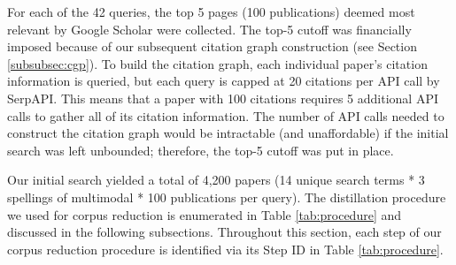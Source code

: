 \documentclass[manuscript,screen,review]{acmart}
\begin{document}
For each of the 42 queries, the top 5 pages (100 publications) deemed most relevant by Google Scholar were collected. The top-5 cutoff was financially imposed because of our subsequent citation graph construction (see Section \ref{subsubsec:cgp}). To build the citation graph, each individual paper's citation information is queried, but each query is capped at 20 citations per API call by SerpAPI. This means that a paper with 100 citations requires 5 additional API calls to gather all of its citation information. The number of API calls needed to construct the citation graph would be intractable (and unaffordable) if the initial search was left unbounded; therefore, the top-5 cutoff was put in place.

Our initial search yielded a total of 4,200 papers (14 unique search terms * 3 spellings of multimodal * 100 publications per query). The distillation procedure we used for corpus reduction is enumerated in Table \ref{tab:procedure} and discussed in the following subsections. Throughout this section, each step of our corpus reduction procedure is identified via its Step ID in Table \ref{tab:procedure}.
\end{document}
